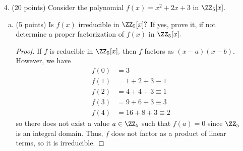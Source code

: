 \documentclass{article}
\begin{document}
\begin{itemize}
\begin{enumerate}[(a)]
			\item (10 points) Is $I$ a maximal ideal? Prove or disprove it.
				\begin{proof}
					Clearly $I\neq A$ since not all continuous functions evaluate to 0 at $1/2.$ Let $J$ be an ideal in $A$ such that $I\subsetneq J\subseteq A.$ Then there exists an element $g\in J$ such that $g\notin I\implies g(1/2)\neq 0.$ Then consider some $f\in A,$ which we may write as
					\[f=\left( f-\frac{f(1/2)}{g(1/2)}\cdot g \right) + \frac{f(1/2)}{g(1/2)}\cdot g\]
					Note that
					\begin{align*}
						\left( f-\frac{f(1/2)}{g(1/2)}\cdot g \right)(1/2) = f(1/2) - \frac{f(1/2)}{g(1/2)}\cdot g(1/2) = 0&\implies f-\frac{f(1/2)}{g(1/2)}\cdot g\in I \\
						&\implies f-\frac{f(1/2)}{g(1/2)}\cdot g\in J
					\end{align*}
					since $I$ is a subset of $J,$ and 
					\[\frac{f(1/2)}{g(1/2)}\cdot g\in J\]
					since it is a constant times $g\in J.$ Thus, $f$ is a sum of elements in $J,$ which is an additive subgroup of $A$ and therefore closed under addition, so we conclude that $f\in J$ as well, so $A\subseteq J.$ Combining this with the fact that $J\subseteq A$ we get $A=J.$ Thus, the only ideal of $A$ containing $I$ is $A$ itself, so $I$ is indeed maximal.

				\end{proof}
				
		\end{enumerate}

		\newpage

	\item[4.] (20 points) Consider the polynomial $f(x)=x^2+2x+3$ in $\ZZ_5[x].$
		\begin{enumerate}[(a)]
			\item (5 points) Is $f(x)$ irreducible in $\ZZ_5[x]?$ If yes, prove it, if not determine a proper factorization of $f(x)$ in $\ZZ_5[x].$
				\begin{proof}
					If $f$ is reducible in $\ZZ_5[x],$ then $f$ factors as $(x-a)(x-b).$ However, we have
					\begin{align*}
						f(0) &= 3 \\
						f(1) &= 1+2+3\equiv 1 \\
						f(2) &= 4+4+3\equiv 1 \\
						f(3) &= 9+6+3\equiv3 \\
						f(4) &= 16+8+3\equiv 2
					\end{align*}
					so there does not exist a value $a\in \ZZ_5$ such that $f(a)=0$ since $\ZZ_5$ is an integral domain. Thus, $f$ does not factor as a product of linear terms, so it is irreducible.
				\end{proof}


\end{enumerate}
\end{itemize}
\end{document}
